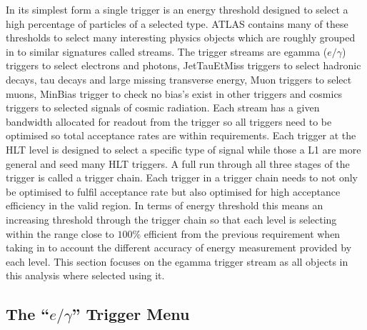 	In its simplest form a single trigger is an energy threshold designed to select a high percentage of particles of a selected type. ATLAS contains many of these thresholds to select many interesting physics objects which are roughly grouped in to similar signatures called streams. The trigger streams are egamma ($e/\gamma$) triggers to select electrons and photons, JetTauEtMiss triggers to select hadronic decays, tau decays and large missing transverse energy, Muon triggers to select muons, MinBias trigger to check no bias's exist in other triggers and cosmics triggers to selected signals of cosmic radiation. Each stream has a given bandwidth allocated for readout from the trigger so all triggers need to be optimised so total acceptance rates are within requirements. Each trigger at the HLT level is designed to select a specific type of signal while those a L1 are more general and seed many HLT triggers. A full run through all three stages of the trigger is called a trigger chain. Each trigger in a trigger chain needs to not only be optimised to fulfil acceptance rate but also optimised for high acceptance efficiency in the valid region. In terms of energy threshold this means an increasing threshold through the trigger chain so that each level is selecting within the range close to $100\%$ efficient from the previous requirement when taking in to account the different accuracy of energy measurement provided by each level. This section focuses on the egamma trigger stream as all objects in this analysis where selected using it.





	\subsection{\texorpdfstring{The ``$e/\gamma$'' Trigger Menu}{The ``e/gamma'' Trigger Menu}} 
		\label{sec:egammaMenu}

